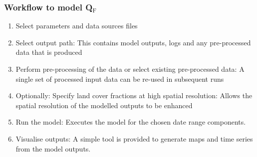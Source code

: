 \documentclass[letterpaper,10pt,english]{sphinxmanual}
\begin{document}
\subsubsection{Workflow to model Q$_{\text{F}}$}
\label{\detokenize{OtherManuals/LQF_Manual:workflow-to-model-qf}}\begin{enumerate}
\item {} 
Select parameters and data sources files

\item {} 
Select output path: This contains model outputs, logs and any
pre-processed data that is produced

\item {} 
Perform pre-processing of the data or select existing pre-processed
data: A single set of processed input data can be re-used in
subsequent runs

\item {} 
Optionally: Specify land cover fractions at high spatial resolution:
Allows the spatial resolution of the modelled outputs to be enhanced

\item {} 
Run the model: Executes the model for the chosen date range
components.

\item {} 
Visualise outputs: A simple tool is provided to generate maps and
time series from the model outputs.

\end{enumerate}
\end{document}
